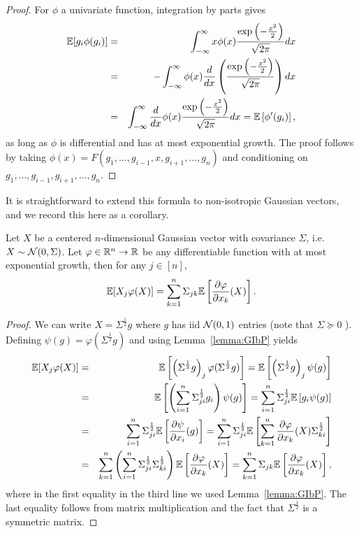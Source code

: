 \begin{proof}
For $\phi$ a univariate function, integration by parts gives
\begin{eqnarray*}
\mathbb{E} [ g_i \phi(g_i) ] & = & \int_{-\infty}^\infty x\phi(x) \frac{\exp\left(-\frac{x^2}{2}\right)}{\sqrt{2\pi}}dx \\
& = & - \int_{-\infty}^\infty \phi(x) \frac{d}{dx}\left(\frac{\exp\left(-\frac{x^2}{2}\right)}{\sqrt{2\pi}}\right)dx  \\
& = & \int_{-\infty}^\infty \frac{d}{dx} \phi(x) \frac{\exp\left(-\frac{x^2}{2}\right)}{\sqrt{2\pi}} dx = \mathbb{E} \left[  \phi'(g_i) \right],
\end{eqnarray*}
as long as $\phi$ is differential and has at most exponential growth. The proof follows by taking $\phi(x)=F(g_1,\dots,g_{i-1},x,g_{i+1},\dots,g_n)$ and conditioning on $g_1,\dots,g_{i-1},g_{i+1},\dots,g_n$.
\end{proof}

It is straightforward to extend this formula to non-isotropic Gaussian vectors, and we record this here as a corollary.
\begin{corollary}\label{cor:GIbP}
Let $X$ be a centered $n$-dimensional Gaussian vector with covariance $\Sigma$, i.e. $X\sim\mathcal{N}(0,\Sigma)$. Let $\varphi\in\mathbb{R}^n\to\mathbb{R}$ be any differentiable function with at most exponential growth,
then for any $j\in[n]$,
\[
\mathbb{E}[X_j \varphi(X)] = \sum_{k=1}^n  \Sigma_{jk}  \mathbb{E}\left[\frac{\partial \varphi}{\partial x_k}(X)\right].
\]
\end{corollary}
\begin{proof}
We can write $X=\Sigma^{\frac12}g$ where $g$ has iid $\mathcal{N}(0,1)$ entries (note that $\Sigma \succeq 0$%
). Defining $\psi(g) = \varphi(\Sigma^{\frac12}g) %
$ and using Lemma~\ref{lemma:GIbP} yields
\begin{eqnarray*}
\mathbb{E}[X_j \varphi(X)] & = & \mathbb{E}\left[\left(\Sigma^{\frac12}g\right)_{j} \varphi(\Sigma^{\frac12}g)\right] = \mathbb{E}\left[\left(\Sigma^{\frac12}g\right)_{j} \psi(g)\right] \\
& = & \mathbb{E}\left[ \left(\sum_{i=1}^n \Sigma^{\frac12}_{ji}g_i \right) \psi(g) \right]
=
 \sum_{i=1}^n \Sigma^{\frac12}_{ji} \mathbb{E}\left[ g_i   \psi(g) \right] \\
 & = & 
 \sum_{i=1}^n \Sigma^{\frac12}_{ji} \mathbb{E}\left[   \frac{\partial \psi}{\partial x_i}(g) \right] = \sum_{i=1}^n \Sigma^{\frac12}_{ji} \mathbb{E}\left[ \sum_{k=1}^n \frac{\partial \varphi}{\partial x_k}(X) \Sigma^{\frac12}_{ki} \right] \\
 & = & \sum_{k=1}^n \left( \sum_{i=1}^n \Sigma^{\frac12}_{ji} \Sigma^{\frac12}_{ki} \right) \mathbb{E}\left[\frac{\partial \varphi}{\partial x_k}(X) \right] = \sum_{k=1}^n  \Sigma_{jk}  \mathbb{E}\left[\frac{\partial \varphi}{\partial x_k}(X) \right],
\end{eqnarray*}
where in the first equality in the third line we used Lemma~\ref{lemma:GIbP}. The last equality follows from matrix multiplication and the fact that $\Sigma^{\frac12}$ is a symmetric matrix.
\end{proof}


